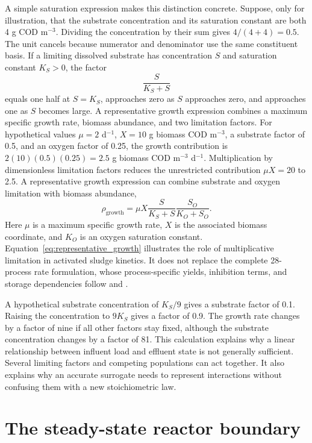 A simple saturation expression makes this distinction concrete. Suppose, only for illustration, that the substrate concentration and its saturation constant are both 4 g COD m$^{-3}$. Dividing the concentration by their sum gives $4/(4+4)=0.5$. The unit cancels because numerator and denominator use the same constituent basis. If a limiting dissolved substrate has concentration $S$ and saturation constant $K_S>0$, the factor
\begin{equation}
\frac{S}{K_S+S}
\label{eq:saturation_example}
\end{equation}
equals one half at $S=K_S$, approaches zero as $S$ approaches zero, and approaches one as $S$ becomes large. A representative growth expression combines a maximum specific growth rate, biomass abundance, and two limitation factors. For hypothetical values $\mu=2$ d$^{-1}$, $X=10$ g biomass COD m$^{-3}$, a substrate factor of 0.5, and an oxygen factor of 0.25, the growth contribution is $2(10)(0.5)(0.25)=2.5$ g biomass COD m$^{-3}$ d$^{-1}$. Multiplication by dimensionless limitation factors reduces the unrestricted contribution $\mu X=20$ to 2.5. A representative growth expression can combine substrate and oxygen limitation with biomass abundance,
\begin{equation}
\rho_{\mathrm{growth}}=
\mu X\frac{S}{K_S+S}\frac{S_O}{K_O+S_O}.
\label{eq:representative_growth}
\end{equation}
Here $\mu$ is a maximum specific growth rate, $X$ is the associated biomass coordinate, and $K_O$ is an oxygen saturation constant. Equation~\eqref{eq:representative_growth} illustrates the role of multiplicative limitation in activated sludge kinetics. It does not replace the complete 28-process rate formulation, whose process-specific yields, inhibition terms, and storage dependencies follow \citet{Henze2006} and \citet{Guerrero2011}.

A hypothetical substrate concentration of $K_S/9$ gives a substrate factor of 0.1. Raising the concentration to $9K_S$ gives a factor of 0.9. The growth rate changes by a factor of nine if all other factors stay fixed, although the substrate concentration changes by a factor of 81. This calculation explains why a linear relationship between influent load and effluent state is not generally sufficient. Several limiting factors and competing populations can act together. It also explains why an accurate surrogate needs to represent interactions without confusing them with a new stoichiometric law.

\section{The steady-state reactor boundary}

